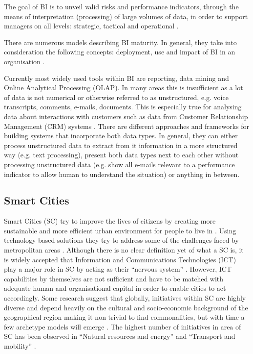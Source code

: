 The goal of BI is to unveil valid risks and performance indicators, through the means of interpretation (processing) of large volumes of data, in order to support managers on all levels: strategic, tactical and operational \citep{baars2008management}.

There are numerous models describing BI maturity. In general, they take into consideration the following concepts: deployment, use and impact of BI in an organisation \citep{Lahrmann2011}.

Currently most widely used tools within BI are reporting, data mining and Online Analytical Processing (OLAP). In many areas this is insufficient as a lot of data is not numerical or otherwise referred to as unstructured, e.g. voice transcripts, comments, e-mails, documents. This is especially true for analysing data about interactions with customers such as data from Customer Relationship Management (CRM) systems \citep{baars2008management}. There are different approaches and frameworks for building systems that incorporate both data types. In general, they can either process unstructured data to extract from it information in a more structured way (e.g. text processing), present both data types next to each other without processing unstructured data (e.g. show all e-mails relevant to a performance indicator to allow human to understand the situation) or anything in between.

		\subsection{Smart Cities}
		
Smart Cities (SC) try to improve the lives of citizens by creating more sustainable and more efficient urban environment for people to live in \citep{geertman2015planning}. Using technology-based solutions they try to address some of the challenges faced by metropolitan areas \citep{Neirotti2014}. Although there is no clear definition yet of what a SC is, it is widely accepted that Information and Communications Technologies (ICT) play a major role in SC by acting as their “nervous system” \citep{Neirotti2014, geertman2015planning}. However, ICT capabilities by themselves are not sufficient and have to be matched with adequate human and organisational capital in order to enable cities to act accordingly.  Some research suggest that globally, initiatives within SC are highly diverse and depend heavily on the cultural and socio-economic background of the geographical region making it non trivial to find commonalities, but with time a few archetype models will emerge \citep{Neirotti2014, geertman2015planning}. The highest number of initiatives in area of SC has been observed in “Natural resources and energy” and “Transport and mobility” \citep{Neirotti2014}.

